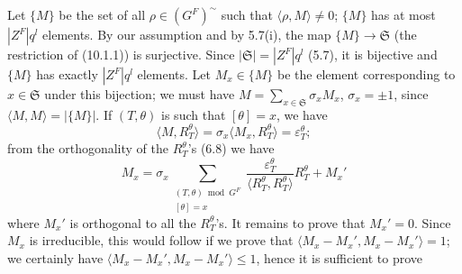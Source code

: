 \documentclass[9pt,twoside]{extarticle}
\begin{document}
{Let \(\{M\}\) be the set of all \(\rho\in(G^F)^{\sim}\) such that \(\langle\rho,M\rangle\ne0\); \(\{M\}\) has at most \(|Z^F|q^l\) elements. By our assumption and by 5.7(i), the map \(\{M\}\to\mathfrak S\) (the restriction of (10.1.1)) is surjective. Since \(|\mathfrak S|=|Z^F|q^l\) (5.7), it is bijective and \(\{M\}\) has exactly \(|Z^F|q^l\) elements. Let \(M_x\in\{M\}\) be the element corresponding to \(x\in\mathfrak S\) under this bijection; we must have \(M=\sum_{x\in\mathfrak S}\sigma_xM_x\), \(\sigma_x=\pm1\), since \(\langle M,M\rangle=|\{M\}|\). If \((T,\theta)\) is such that \([\theta]=x\), we have \[
\langle M,R_T^\theta\rangle
=
\sigma_x\langle M_x,R_T^\theta\rangle
=
\varepsilon_T^\theta;
\] from the orthogonality of the \(R_T^\theta\)'s (6.8) we have \[
M_x
=
\sigma_x
\sum_{\substack{(T,\theta)\bmod G^F\\{}[\theta]=x}}
\frac{\varepsilon_T^\theta}{\langle R_T^\theta,R_T^\theta\rangle}R_T^\theta
+M_x'
\] where \(M_x'\) is orthogonal to all the \(R_T^\theta\)'s. It remains to prove that \(M_x'=0\). Since \(M_x\) is irreducible, this would follow if we prove that \(\langle M_x-M_x',M_x-M_x'\rangle=1\); we certainly have \(\langle M_x-M_x',M_x-M_x'\rangle\le1\), hence it is sufficient to prove\par
}
\end{document}
